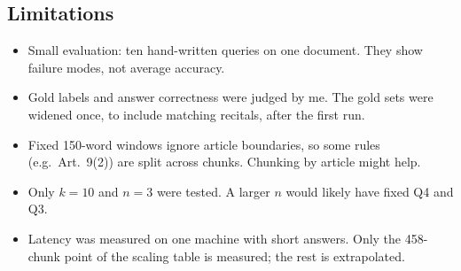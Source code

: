 \documentclass[10pt,a4paper]{article}
\begin{document}
\subsection{Limitations}
\begin{itemize}
  \item Small evaluation: ten hand-written queries on one document. They show failure modes,
        not average accuracy.
  \item Gold labels and answer correctness were judged by me. The gold sets were widened once,
        to include matching recitals, after the first run.
  \item Fixed 150-word windows ignore article boundaries, so some rules (e.g.\ Art.~9(2)) are
        split across chunks. Chunking by article might help.
  \item Only $k=10$ and $n=3$ were tested. A larger $n$ would likely have fixed Q4 and Q3.
  \item Latency was measured on one machine with short answers. Only the 458-chunk point of the scaling table is measured; the rest is extrapolated.
\end{itemize}
\end{document}
